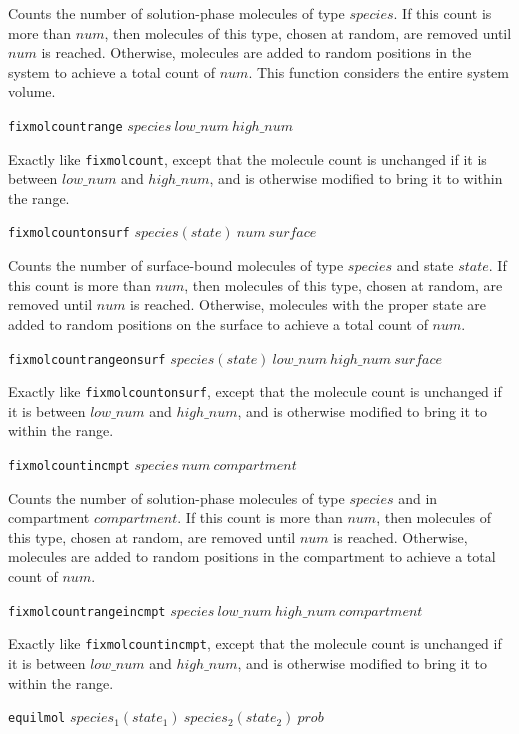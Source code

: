 \documentclass {book}
\newcommand {\ttt} {\texttt}
\begin{document}
\begin{description}
Counts the number of solution-phase molecules of type $species$. If this count is more than $num$, then molecules of this type, chosen at random, are removed until $num$ is reached. Otherwise, molecules are added to random positions in the system to achieve a total count of $num$. This function considers the entire system volume.

\item{\ttt{fixmolcountrange} $species\ low\_num\ high\_num$}

Exactly like \ttt{fixmolcount}, except that the molecule count is unchanged if it is between $low\_num$ and $high\_num$, and is otherwise modified to bring it to within the range.

\item{\ttt{fixmolcountonsurf} $species(state)\ num\ surface$}

Counts the number of surface-bound molecules of type $species$ and state $state$. If this count is more than $num$, then molecules of this type, chosen at random, are removed until $num$ is reached. Otherwise, molecules with the proper state are added to random positions on the surface to achieve a total count of $num$.

\item{\ttt{fixmolcountrangeonsurf} $species(state)\ low\_num\ high\_num\ surface$}

Exactly like \ttt{fixmolcountonsurf}, except that the molecule count is unchanged if it is between $low\_num$ and $high\_num$, and is otherwise modified to bring it to within the range.

\item{\ttt{fixmolcountincmpt} $species\ num\ compartment$}

Counts the number of solution-phase molecules of type $species$ and in compartment $compartment$. If this count is more than $num$, then molecules of this type, chosen at random, are removed until $num$ is reached. Otherwise, molecules are added to random positions in the compartment to achieve a total count of $num$.

\item{\ttt{fixmolcountrangeincmpt} $species\ low\_num\ high\_num\ compartment$}

Exactly like \ttt{fixmolcountincmpt}, except that the molecule count is unchanged if it is between $low\_num$ and $high\_num$, and is otherwise modified to bring it to within the range.

\item{\ttt{equilmol} $species_1(state_1)\ species_2(state_2)\ prob$}


\end{description}
\end{document}

